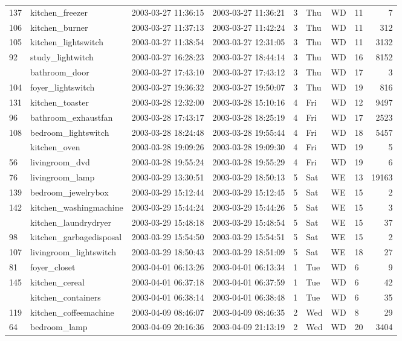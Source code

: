 \documentclass[11pt,]{article}
\begin{document}
\begin{table}[!h]
{\begin{tabular}[t]{llllllllr}
137 & kitchen\_freezer & 2003-03-27 11:36:15 & 2003-03-27 11:36:21 & 3 & Thu & WD & 11 & 7\\
106 & kitchen\_burner & 2003-03-27 11:37:13 & 2003-03-27 11:42:24 & 3 & Thu & WD & 11 & 312\\
105 & kitchen\_lightswitch & 2003-03-27 11:38:54 & 2003-03-27 12:31:05 & 3 & Thu & WD & 11 & 3132\\
92 & study\_lightwitch & 2003-03-27 16:28:23 & 2003-03-27 18:44:14 & 3 & Thu & WD & 16 & 8152\\
\addlinespace
130 & bathroom\_door & 2003-03-27 17:43:10 & 2003-03-27 17:43:12 & 3 & Thu & WD & 17 & 3\\
104 & foyer\_lightswitch & 2003-03-27 19:36:32 & 2003-03-27 19:50:07 & 3 & Thu & WD & 19 & 816\\
131 & kitchen\_toaster & 2003-03-28 12:32:00 & 2003-03-28 15:10:16 & 4 & Fri & WD & 12 & 9497\\
96 & bathroom\_exhaustfan & 2003-03-28 17:43:17 & 2003-03-28 18:25:19 & 4 & Fri & WD & 17 & 2523\\
108 & bedroom\_lightswitch & 2003-03-28 18:24:48 & 2003-03-28 19:55:44 & 4 & Fri & WD & 18 & 5457\\
\addlinespace
129 & kitchen\_oven & 2003-03-28 19:09:26 & 2003-03-28 19:09:30 & 4 & Fri & WD & 19 & 5\\
56 & livingroom\_dvd & 2003-03-28 19:55:24 & 2003-03-28 19:55:29 & 4 & Fri & WD & 19 & 6\\
76 & livingroom\_lamp & 2003-03-29 13:30:51 & 2003-03-29 18:50:13 & 5 & Sat & WE & 13 & 19163\\
139 & bedroom\_jewelrybox & 2003-03-29 15:12:44 & 2003-03-29 15:12:45 & 5 & Sat & WE & 15 & 2\\
142 & kitchen\_washingmachine & 2003-03-29 15:44:24 & 2003-03-29 15:44:26 & 5 & Sat & WE & 15 & 3\\
\addlinespace
90 & kitchen\_laundrydryer & 2003-03-29 15:48:18 & 2003-03-29 15:48:54 & 5 & Sat & WE & 15 & 37\\
98 & kitchen\_garbagedisposal & 2003-03-29 15:54:50 & 2003-03-29 15:54:51 & 5 & Sat & WE & 15 & 2\\
107 & livingroom\_lightswitch & 2003-03-29 18:50:43 & 2003-03-29 18:51:09 & 5 & Sat & WE & 18 & 27\\
81 & foyer\_closet & 2003-04-01 06:13:26 & 2003-04-01 06:13:34 & 1 & Tue & WD & 6 & 9\\
145 & kitchen\_cereal & 2003-04-01 06:37:18 & 2003-04-01 06:37:59 & 1 & Tue & WD & 6 & 42\\
\addlinespace
60 & kitchen\_containers & 2003-04-01 06:38:14 & 2003-04-01 06:38:48 & 1 & Tue & WD & 6 & 35\\
119 & kitchen\_coffeemachine & 2003-04-09 08:46:07 & 2003-04-09 08:46:35 & 2 & Wed & WD & 8 & 29\\
64 & bedroom\_lamp & 2003-04-09 20:16:36 & 2003-04-09 21:13:19 & 2 & Wed & WD & 20 & 3404\\
\bottomrule
\end{tabular}}
\end{table}
\end{document}
